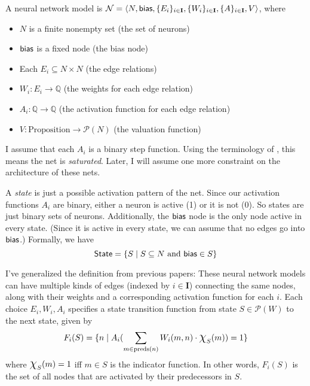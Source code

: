 \documentclass[letterpaper]{article}
\begin{document}
A neural network model is $\mathcal{N} = \langle N, \mathsf{bias}, \{ E_i \}_{i \in \textbf{I}}, \{ W_i \}_{i \in \textbf{I}}, \{ A \}_{i \in \textbf{I}}, V \rangle$, where
\begin{itemize}
    \item $N$ is a finite nonempty set (the set of neurons)
    \item $\mathsf{bias}$ is a fixed node (the bias node)
    \item Each $E_i \subseteq N \times N$ (the edge relations)
    \item $W_i : E_i \to \mathbb{Q}$ (the weights for each edge relation)
    \item $A_i : \mathbb{Q} \to \mathbb{Q}$ (the activation function for each edge relation)
    \item $V : \textrm{Proposition} \to \mathcal{P}(N)$ (the valuation function)
\end{itemize}
I assume that each $A_i$ is a binary step function. Using the terminology of \cite{merrill2020formal}, this means the net is \emph{saturated}.  Later, I will assume one more constraint on the architecture of these nets.

A \emph{state} is just a possible activation pattern of the net. Since our activation functions $A_i$ are binary, either a neuron is active (1) or it is not (0).  So states are just binary sets of neurons. Additionally, the $\mathsf{bias}$ node is the only node active in every state. (Since it is active in every state, we can assume that no edges go into $\mathsf{bias}$.) Formally, we have
\[
    \mathsf{State} = \{ S \mid S \subseteq N \mbox{ and } \mathsf{bias} \in S \}
\]

I've generalized the definition from previous papers: These neural network models can have multiple kinds of edges (indexed by $i \in \textbf{I}$) connecting the same nodes, along with their weights and a corresponding activation function for each $i$.  Each choice $E_i, W_i, A_i$ specifies a state transition function from state $S \in \mathcal{P}(W)$ to the next state, given by
\[
    F_i(S) = \{ n \mid A_i(\sum_{m \in \mathrm{preds}(n)} W_i(m, n) \cdot \mbox{\Large$\chi$}_S(m)) = 1 \}
\]
where $\mbox{\Large$\chi$}_S(m) = 1$ iff $m \in S$ is the indicator function.  In other words, $F_i(S)$ is the set of all nodes that are activated by their predecessors in $S$.


\end{document}
